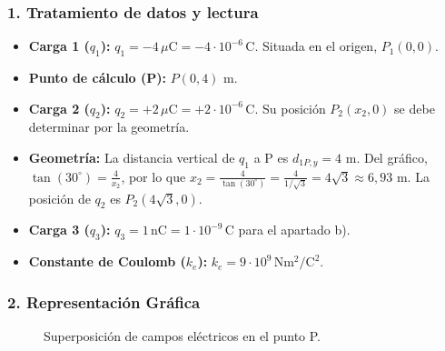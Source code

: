 \subsubsection*{1. Tratamiento de datos y lectura}
\begin{itemize}
    \item \textbf{Carga 1 ($q_1$):} $q_1 = -4 \, \mu\text{C} = -4 \cdot 10^{-6} \, \text{C}$. Situada en el origen, $P_1(0,0)$.
    \item \textbf{Punto de cálculo (P):} $P(0,4)$ m.
    \item \textbf{Carga 2 ($q_2$):} $q_2 = +2 \, \mu\text{C} = +2 \cdot 10^{-6} \, \text{C}$. Su posición $P_2(x_2, 0)$ se debe determinar por la geometría.
    \item \textbf{Geometría:} La distancia vertical de $q_1$ a P es $d_{1P,y}=4$ m. Del gráfico, $\tan(30^{\circ}) = \frac{4}{x_2}$, por lo que $x_2 = \frac{4}{\tan(30^{\circ})} = \frac{4}{1/\sqrt{3}} = 4\sqrt{3} \approx 6,93$ m. La posición de $q_2$ es $P_2(4\sqrt{3}, 0)$.
    \item \textbf{Carga 3 ($q_3$):} $q_3 = 1 \, \text{nC} = 1 \cdot 10^{-9} \, \text{C}$ para el apartado b).
    \item \textbf{Constante de Coulomb ($k_e$):} $k_e = 9\cdot10^9 \, \text{N}\text{m}^2/\text{C}^2$.
\end{itemize}

\subsubsection*{2. Representación Gráfica}
\begin{figure}[H]
    \centering
    \caption{Superposición de campos eléctricos en el punto P.}
\end{figure}

